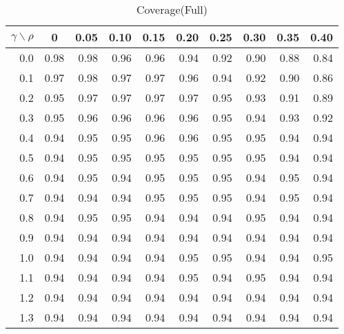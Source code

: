\documentclass[12pt]{article}
\begin{document}
%
\begin{table}[!tbp]
\caption{Coverage(Full)}
 \begin{center}
 \begin{tabular}{r|rrrrrrrrr}\hline\hline
\multicolumn{1}{c|}{$\gamma\backslash\rho$}&\multicolumn{1}{c}{0}&\multicolumn{1}{c}{0.05}&\multicolumn{1}{c}{0.10}&\multicolumn{1}{c}{0.15}&\multicolumn{1}{c}{0.20}&\multicolumn{1}{c}{0.25}&\multicolumn{1}{c}{0.30}&\multicolumn{1}{c}{0.35}&\multicolumn{1}{c}{0.40}\tabularnewline
\hline

0.0&0.98&0.98&0.96&0.96&0.94&0.92&0.90&0.88&0.84\tabularnewline
0.1&0.97&0.98&0.97&0.97&0.96&0.94&0.92&0.90&0.86\tabularnewline
0.2&0.95&0.97&0.97&0.97&0.97&0.95&0.93&0.91&0.89\tabularnewline
0.3&0.95&0.96&0.96&0.96&0.96&0.95&0.94&0.93&0.92\tabularnewline
0.4&0.94&0.95&0.95&0.96&0.96&0.95&0.95&0.94&0.94\tabularnewline
0.5&0.94&0.95&0.95&0.95&0.95&0.95&0.95&0.94&0.94\tabularnewline
0.6&0.94&0.95&0.94&0.95&0.95&0.95&0.94&0.95&0.94\tabularnewline
0.7&0.94&0.94&0.94&0.95&0.95&0.95&0.94&0.95&0.94\tabularnewline
0.8&0.94&0.95&0.95&0.94&0.94&0.94&0.95&0.94&0.94\tabularnewline
0.9&0.94&0.94&0.94&0.94&0.94&0.94&0.94&0.94&0.94\tabularnewline
1.0&0.94&0.94&0.94&0.94&0.95&0.95&0.94&0.94&0.95\tabularnewline
1.1&0.94&0.94&0.94&0.94&0.95&0.94&0.95&0.94&0.94\tabularnewline
1.2&0.94&0.94&0.94&0.94&0.94&0.94&0.94&0.94&0.94\tabularnewline
1.3&0.94&0.94&0.94&0.94&0.94&0.94&0.94&0.94&0.94\tabularnewline
\hline
\end{tabular}

\end{center}

\end{table}
\end{document}

